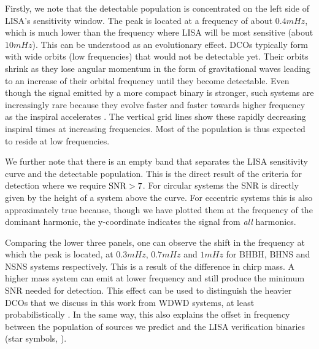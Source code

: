 Firstly, we note that the detectable population is concentrated on the left side of LISA's sensitivity window. The peak is located at a frequency of about $0.4 \unit{mHz}$, which is much lower than the frequency where LISA will be most sensitive (about $10 \unit{mHz}$). This can be understood as an evolutionary effect. DCOs typically form with wide orbits (low frequencies) that would not be detectable yet. Their orbits shrink as they lose angular momentum in the form of gravitational waves leading to an increase of their orbital frequency until they become detectable. Even though the signal emitted by a more compact binary is stronger, such systems are increasingly rare because they evolve faster and faster towards higher frequency as the inspiral accelerates \citep{Peters+1964}. The vertical grid lines show these rapidly decreasing inspiral times at increasing frequencies. Most of the population is thus expected to reside at low frequencies.

We further note that there is an empty band that separates the LISA sensitivity curve and the detectable population. This is the direct result of the criteria for detection where we require $\rm{SNR} > 7$. For circular systems the SNR is directly given by the height of a system above the curve. For eccentric systems this is also approximately true because, though we have plotted them at the frequency of the dominant harmonic, the y-coordinate indicates the signal from \textit{all} harmonics.

Comparing the lower three panels, one can observe the shift in the frequency at which the peak is located, at $0.3 \unit{mHz}$, $0.7 \unit{mHz}$ and $1 \unit{mHz}$ for BHBH, BHNS and NSNS systems respectively. This is a result of the difference in chirp mass. A higher mass system can emit at lower frequency and still produce the minimum SNR needed for detection. This effect can be used to distinguish the heavier DCOs that we discuss in this work from WDWD systems, at least probabilistically \citep[e.g.][]{Sesana+2020}. In the same way, this also explains the offset in frequency between the population of sources we predict and the LISA verification binaries (star symbols, \citealt{Kupfer+2018}).

